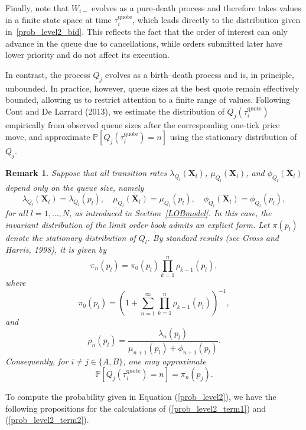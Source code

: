 \documentclass[11pt]{article}
\newtheorem{remark}{Remark}
\newenvironment{proof}{\noindent{\it Proof.}}{\hfill\fbox{}\vspace*{1mm}}
\begin{document}
\begin{proof}
Finally, note that $W_{i-}$ evolves as a pure-death process and therefore takes values in a finite state space at time $\tau_i^{\text{quote}}$, which leads directly to the distribution given in~\eqref{prob_level2_bid}. This reflects the fact that the order of interest can only advance in the queue due to cancellations, while orders submitted later have lower priority and do not affect its execution. 

In contrast, the process $Q_j$ evolves as a birth--death process and is, in principle, unbounded. In practice, however, queue sizes at the best quote remain effectively bounded, allowing us to restrict attention to a finite range of values. Following Cont and De Larrard (2013), we estimate the distribution of $Q_j(\tau_i^{\text{quote}})$ empirically from observed queue sizes after the corresponding one-tick price move, and approximate $\mathbb{P}[Q_j(\tau_i^{\text{quote}})=n]$ using the stationary distribution of $Q_j$.
\end{proof}

\begin{remark}
Suppose that all transition rates $\lambda_{Q_l}(\boldsymbol{X}_l)$, $\mu_{Q_l}(\boldsymbol{X}_l)$, and $\phi_{Q_l}(\boldsymbol{X}_l)$ depend only on the queue size, namely
\[
\lambda_{Q_l}(\boldsymbol{X}_l)=\lambda_{Q_l}(p_l), \quad
\mu_{Q_l}(\boldsymbol{X}_l)=\mu_{Q_l}(p_l), \quad
\phi_{Q_l}(\boldsymbol{X}_l)=\phi_{Q_l}(p_l),
\]
for all $l=1,\ldots,N$, as introduced in Section~\ref{LOBmodel}. In this case, the invariant distribution of the limit order book admits an explicit form. Let $\pi(p_l)$ denote the stationary distribution of $Q_l$. By standard results (see Gross and Harris, 1998), it is given by
\begin{equation}
\pi_n(p_l)=\pi_0(p_l)\prod_{k=1}^{n}\rho_{k-1}(p_l),
\end{equation}
where
\begin{equation}
\pi_0(p_l)=\left(1+\sum_{n=1}^{\infty}\prod_{k=1}^{n}\rho_{k-1}(p_l)\right)^{-1},
\end{equation}
and
\begin{equation}
\rho_n(p_l)=\frac{\lambda_n(p_l)}{\mu_{n+1}(p_l)+\phi_{n+1}(p_l)}.
\end{equation}
Consequently, for $i\neq j\in\{A,B\}$, one may approximate
\[
\mathbb{P}[Q_j(\tau_i^{\text{quote}})=n]=\pi_n(p_j).
\]
\end{remark}


To compute the probability given in Equation (\ref{prob_level2}), we have the following propositions for the calculations of (\ref{prob_level2_term1}) and (\ref{prob_level2_term2}).
\end{document}
